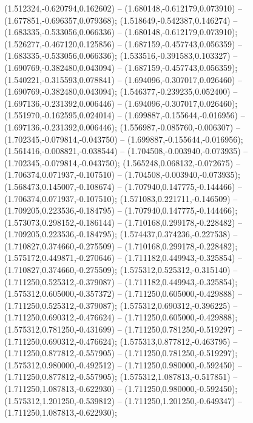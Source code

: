  (1.512324,-0.620794,0.162602) -- (1.680148,-0.612179,0.073910) -- (1.677851,-0.696357,0.079368);
 (1.518649,-0.542387,0.146274) -- (1.683335,-0.533056,0.066336) -- (1.680148,-0.612179,0.073910);
 (1.526277,-0.467120,0.125856) -- (1.687159,-0.457743,0.056359) -- (1.683335,-0.533056,0.066336);
 (1.533516,-0.391583,0.103327) -- (1.690769,-0.382480,0.043094) -- (1.687159,-0.457743,0.056359);
 (1.540221,-0.315593,0.078841) -- (1.694096,-0.307017,0.026460) -- (1.690769,-0.382480,0.043094);
 (1.546377,-0.239235,0.052400) -- (1.697136,-0.231392,0.006446) -- (1.694096,-0.307017,0.026460);
 (1.551970,-0.162595,0.024014) -- (1.699887,-0.155644,-0.016956) -- (1.697136,-0.231392,0.006446);
 (1.556987,-0.085760,-0.006307) -- (1.702345,-0.079814,-0.043750) -- (1.699887,-0.155644,-0.016956);
 (1.561416,-0.008821,-0.038544) -- (1.704508,-0.003940,-0.073935) -- (1.702345,-0.079814,-0.043750);
 (1.565248,0.068132,-0.072675) -- (1.706374,0.071937,-0.107510) -- (1.704508,-0.003940,-0.073935);
 (1.568473,0.145007,-0.108674) -- (1.707940,0.147775,-0.144466) -- (1.706374,0.071937,-0.107510);
 (1.571083,0.221711,-0.146509) -- (1.709205,0.223536,-0.184795) -- (1.707940,0.147775,-0.144466);
 (1.573073,0.298152,-0.186144) -- (1.710168,0.299178,-0.228482) -- (1.709205,0.223536,-0.184795);
 (1.574437,0.374236,-0.227538) -- (1.710827,0.374660,-0.275509) -- (1.710168,0.299178,-0.228482);
 (1.575172,0.449871,-0.270646) -- (1.711182,0.449943,-0.325854) -- (1.710827,0.374660,-0.275509);
 (1.575312,0.525312,-0.315140) -- (1.711250,0.525312,-0.379087) -- (1.711182,0.449943,-0.325854);
 (1.575312,0.605000,-0.357372) -- (1.711250,0.605000,-0.429888) -- (1.711250,0.525312,-0.379087);
 (1.575312,0.690312,-0.396225) -- (1.711250,0.690312,-0.476624) -- (1.711250,0.605000,-0.429888);
 (1.575312,0.781250,-0.431699) -- (1.711250,0.781250,-0.519297) -- (1.711250,0.690312,-0.476624);
 (1.575313,0.877812,-0.463795) -- (1.711250,0.877812,-0.557905) -- (1.711250,0.781250,-0.519297);
 (1.575312,0.980000,-0.492512) -- (1.711250,0.980000,-0.592450) -- (1.711250,0.877812,-0.557905);
 (1.575312,1.087813,-0.517851) -- (1.711250,1.087813,-0.622930) -- (1.711250,0.980000,-0.592450);
 (1.575312,1.201250,-0.539812) -- (1.711250,1.201250,-0.649347) -- (1.711250,1.087813,-0.622930);
